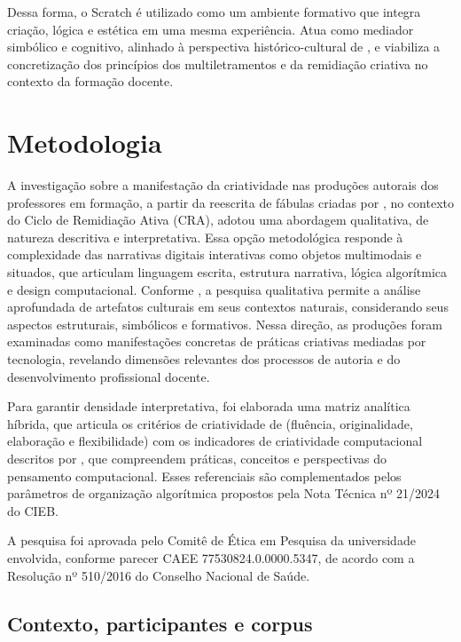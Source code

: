 \documentclass[portuguese]{textolivre}
\begin{document}
Dessa forma, o Scratch é utilizado como um ambiente formativo que integra criação, lógica e estética em uma mesma experiência. Atua como mediador simbólico e cognitivo, alinhado à perspectiva histórico-cultural de \textcite{vygotsky2007}, e viabiliza a concretização dos princípios dos multiletramentos e da remidiação criativa no contexto da formação docente.


\section{Metodologia}\label{sec-metodologia}

A investigação sobre a manifestação da criatividade nas produções autorais dos professores em formação, a partir da reescrita de fábulas criadas por \textcite{foohs2022b}, no contexto do Ciclo de Remidiação Ativa (CRA), adotou uma abordagem qualitativa, de natureza descritiva e interpretativa. Essa opção metodológica responde à complexidade das narrativas digitais interativas como objetos multimodais e situados, que articulam linguagem escrita, estrutura narrativa, lógica algorítmica e design computacional. Conforme \textcite{bogdan1994}, a pesquisa qualitativa permite a análise aprofundada de artefatos culturais em seus contextos naturais, considerando seus aspectos estruturais, simbólicos e formativos. Nessa direção, as produções foram examinadas como manifestações concretas de práticas criativas mediadas por tecnologia, revelando dimensões relevantes dos processos de autoria e do desenvolvimento profissional docente.

Para garantir densidade interpretativa, foi elaborada uma matriz analítica híbrida, que articula os critérios de criatividade de \textcite{torrance1995} (fluência, originalidade, elaboração e flexibilidade) com os indicadores de criatividade computacional descritos por \textcite{brennan2012}, que compreendem práticas, conceitos e perspectivas do pensamento computacional. Esses referenciais são complementados pelos parâmetros de organização algorítmica propostos pela Nota Técnica nº 21/2024 do CIEB.

A pesquisa foi aprovada pelo Comitê de Ética em Pesquisa da universidade envolvida, conforme parecer CAEE 77530824.0.0000.5347, de acordo com a Resolução nº 510/2016 do Conselho Nacional de Saúde.


\subsection{Contexto, participantes e corpus}
\end{document}
